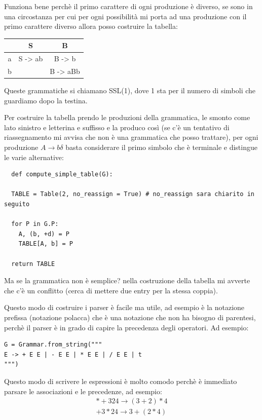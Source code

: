 Funziona bene perchè il primo carattere di ogni produzione è diverso, se sono in una circostanza per cui per ogni possibilità mi porta ad una produzione con il primo carattere diverso allora posso costruire la tabella:
\begin{table}[ht!]
  \centering
  \begin{tabular}{|c|c|c|}
    \hline
    & \textbf{S} & \textbf{B} \\ \hline
    a & S -> ab & B -> b \\ \hline
    b &   & B -> aBb \\ \hline
  \end{tabular}
\end{table}

Queste grammatiche si chiamano SSL(1), dove 1 sta per il numero di simboli che guardiamo dopo la testina.

Per costruire la tabella prendo le produzioni della grammatica, le smonto come lato sinistro e letterina e suffisso e la produco così (se c'è un tentativo di riassegnamento mi avvisa che non è una grammatica che posso trattare), per ogni produzione $A \rightarrow b\delta$ basta considerare il primo simbolo che è terminale e distingue le varie alternative:
\begin{lstlisting}
  def compute_simple_table(G):

  TABLE = Table(2, no_reassign = True) # no_reassign sara chiarito in seguito

  for P in G.P:
    A, (b, +d) = P
    TABLE[A, b] = P

  return TABLE
\end{lstlisting}

Ma se la grammatica non è semplice? nella costruzione della tabella mi avverte che c'è un conflitto (cerca di mettere due entry per la stessa coppia).

Questo modo di costruire i parser è facile ma utile, ad esempio è la notazione prefissa (notazione polacca) che è una notazione che non ha bisogno di parentesi, perchè il parser è in grado di capire la precedenza degli operatori. Ad esempio:
\begin{lstlisting}
G = Grammar.from_string("""
E -> + E E | - E E | * E E | / E E | t
""")
\end{lstlisting}

Questo modo di scrivere le espressioni è molto comodo perchè è immediato parsare le associazioni e le precedenze, ad esempio:
\[\begin{split}
* + 324 \rightarrow (3 + 2) * 4 \\
+ 3 * 2 4 \rightarrow 3 + (2 * 4) 
\end{split}
\]

